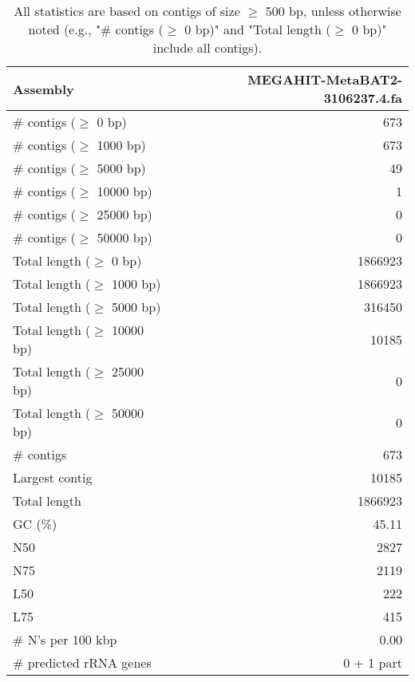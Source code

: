 \documentclass[12pt,a4paper]{article}
\begin{document}
\begin{table}[ht]
\begin{center}
\caption{All statistics are based on contigs of size $\geq$ 500 bp, unless otherwise noted (e.g., "\# contigs ($\geq$ 0 bp)" and "Total length ($\geq$ 0 bp)" include all contigs).}
\begin{tabular}{|l*{1}{|r}|}
\hline
Assembly & MEGAHIT-MetaBAT2-3106237.4.fa \\ \hline
\# contigs ($\geq$ 0 bp) & 673 \\ \hline
\# contigs ($\geq$ 1000 bp) & 673 \\ \hline
\# contigs ($\geq$ 5000 bp) & 49 \\ \hline
\# contigs ($\geq$ 10000 bp) & 1 \\ \hline
\# contigs ($\geq$ 25000 bp) & 0 \\ \hline
\# contigs ($\geq$ 50000 bp) & 0 \\ \hline
Total length ($\geq$ 0 bp) & 1866923 \\ \hline
Total length ($\geq$ 1000 bp) & 1866923 \\ \hline
Total length ($\geq$ 5000 bp) & 316450 \\ \hline
Total length ($\geq$ 10000 bp) & 10185 \\ \hline
Total length ($\geq$ 25000 bp) & 0 \\ \hline
Total length ($\geq$ 50000 bp) & 0 \\ \hline
\# contigs & 673 \\ \hline
Largest contig & 10185 \\ \hline
Total length & 1866923 \\ \hline
GC (\%) & 45.11 \\ \hline
N50 & 2827 \\ \hline
N75 & 2119 \\ \hline
L50 & 222 \\ \hline
L75 & 415 \\ \hline
\# N's per 100 kbp & 0.00 \\ \hline
\# predicted rRNA genes & 0 + 1 part \\ \hline
\end{tabular}
\end{center}
\end{table}
\end{document}
